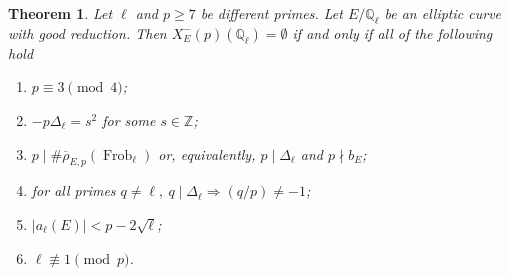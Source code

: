 \documentclass[12pt]{amsart}
\numberwithin{equation}{section}
\newtheorem{theorem}[equation]{Theorem}
\theoremstyle{definition}
\newcommand{\Q}{\mathbb{Q}}
\newcommand{\Z}{\mathbb{Z}}
\newcommand{\rhobar}{{\overline{\rho}}}
\DeclareMathOperator{\Frob}{Frob}
\begin{document}
\begin{theorem}\label{thm:maingood}
Let $\ell$ and $p \geq 7$ be different primes.
Let $E/\Q_\ell$ be an elliptic curve with good reduction.
Then $X_E^-(p)(\Q_\ell)=\emptyset$ if and only if all of the following hold
\begin{enumerate}
\item $p \equiv 3 \pmod{4}$; \label{g1}
 \item $-p\Delta_\ell=s^2$ for some $s \in \Z$;\label{g2}
\item $p\mid \#\rhobar_{E,p}(\Frob_\ell)$ or, equivalently, $p\mid \Delta_\ell$ and $p\nmid b_E$;\label{g3}
\item  for all primes $q\neq \ell, \:q \mid \Delta_\ell \Rightarrow (q/p)\neq -1$; \label{g4}
\item $|a_\ell(E) |< p-2\sqrt{\ell}$; \label{g5}
\item $\ell \not\equiv 1 \pmod{p}$. \label{g6} 
\end{enumerate} 
\end{theorem}
\end{document}

